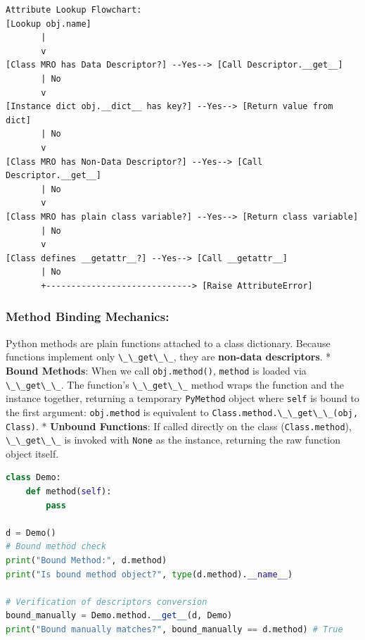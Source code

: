 \begin{lstlisting}
Attribute Lookup Flowchart:
[Lookup obj.name]
       |
       v
[Class MRO has Data Descriptor?] --Yes--> [Call Descriptor.__get__]
       | No
       v
[Instance dict obj.__dict__ has key?] --Yes--> [Return value from dict]
       | No
       v
[Class MRO has Non-Data Descriptor?] --Yes--> [Call Descriptor.__get__]
       | No
       v
[Class MRO has plain class variable?] --Yes--> [Return class variable]
       | No
       v
[Class defines __getattr__?] --Yes--> [Call __getattr__]
       | No
       +-----------------------------> [Raise AttributeError]
\end{lstlisting}

\hypertarget{method-binding-mechanics}{%
\subsubsection{Method Binding
Mechanics:}\label{method-binding-mechanics}}

Python methods are plain functions attached to a class dictionary.
Because functions implement only \passthrough{\lstinline!\_\_get\_\_!},
they are \textbf{non-data descriptors}. * \textbf{Bound Methods}: When
we call \passthrough{\lstinline!obj.method()!},
\passthrough{\lstinline!method!} is loaded via
\passthrough{\lstinline!\_\_get\_\_!}. The function's
\passthrough{\lstinline!\_\_get\_\_!} method wraps the function and the
instance together, returning a temporary
\passthrough{\lstinline!PyMethod!} object where
\passthrough{\lstinline!self!} is bound to the first argument:
\passthrough{\lstinline!obj.method!} is equivalent to
\passthrough{\lstinline!Class.method.\_\_get\_\_(obj, Class)!}. *
\textbf{Unbound Functions}: If called directly on the class
(\passthrough{\lstinline!Class.method!}),
\passthrough{\lstinline!\_\_get\_\_!} is invoked with
\passthrough{\lstinline!None!} as the instance, returning the raw
function object itself.

\begin{lstlisting}[language=Python]
class Demo:
    def method(self):
        pass

d = Demo()
# Bound method check
print("Bound Method:", d.method)
print("Is bound method object?", type(d.method).__name__)

# Verification of descriptors conversion
bound_manually = Demo.method.__get__(d, Demo)
print("Bound manually matches?", bound_manually == d.method) # True
\end{lstlisting}

